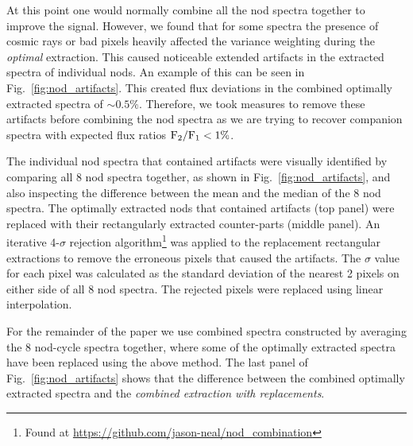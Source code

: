 At this point one would normally combine all the nod spectra together to improve the signal. However, we found that for some spectra the presence of cosmic rays or bad pixels heavily affected the variance weighting during the \emph{optimal} extraction. This caused noticeable extended artifacts in the extracted spectra of individual nods. An example of this can be seen in Fig.~\ref{fig:nod_artifacts}. This created flux deviations in the combined optimally extracted spectra of \(\sim 0.5\% \).  Therefore, we took measures to remove these artifacts before combining the nod spectra as we are trying to recover companion spectra with expected flux ratios \(\rm {F_2}/{F_1} < 1\% \). 

The individual nod spectra that contained artifacts were visually identified by comparing all 8 nod spectra together, as shown in Fig.~\ref{fig:nod_artifacts}, and also inspecting the difference between the mean and the median of the 8 nod spectra. The optimally extracted nods that contained artifacts (top panel) were replaced with their rectangularly extracted counter-parts (middle panel). An iterative 4-\(\sigma \) rejection algorithm\footnote{Found at \url{https://github.com/jason-neal/nod_combination}} was applied to the replacement rectangular extractions to remove the erroneous pixels that caused the artifacts. The \(\sigma\) value for each pixel was calculated as the standard deviation of the nearest 2 pixels on either side of all 8 nod spectra. The rejected pixels were replaced using linear interpolation.

For the remainder of the paper we use combined spectra constructed by averaging the 8 nod-cycle spectra together, where some of the optimally extracted spectra have been replaced using the above method. The last panel of Fig.~\ref{fig:nod_artifacts} shows that the difference between the combined optimally extracted spectra and the \emph{combined extraction with replacements}.

